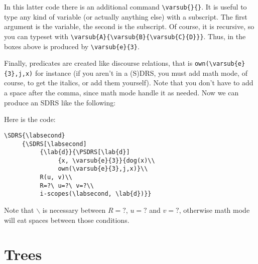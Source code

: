 \documentclass[a4paper]{article}
\begin{document}
In this latter code there is an additional command \verb+\varsub{}{}+. It is useful to type any kind of variable (or actually anything else) with a subscript. The first argument is the variable, the second is the subscript. Of course, it is recursive, so you can typeset  with \verb+\varsub{A}{\varsub{B}{\varsub{C}{D}}}+. Thus,  in the boxes above is produced by \verb+\varsub{e}{3}+.

Finally, predicates are created like discourse relations, that is \verb+own(\varsub{e}{3},j,x)+ for instance (if you aren't in a (S)DRS, you must add math mode, of course, to get the italics, or add them yourself). Note that you don't have to add a space after the comma, since math mode handle it as needed. Now we can produce an SDRS like the following:
\begin{center}
\end{center}
Here is the code:
\begin{verbatim}
\SDRS{\labsecond}
     {\SDRS[\labsecond]
          {\lab{d}}{\PSDRS[\lab{d}]
               {x, \varsub{e}{3}}{dog(x)\\
               own(\varsub{e}{3},j,x)}\\
          R(u, v)\\
          R=?\ u=?\ v=?\\
          i-scopes(\labsecond, \lab{d})}}
\end{verbatim}
Note that $\backslash$ is necessary between $R=?$, $u=?$ and $v=?$, otherwise math mode will eat spaces between those conditions.

\section{Trees}
\end{document}
